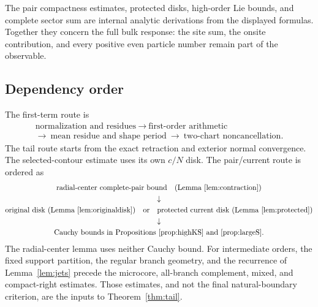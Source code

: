 \documentclass[11pt]{article}
\numberwithin{equation}{section}
\theoremstyle{definition}
\begin{document}
The pair compactness estimates, protected disks, high-order Lie bounds,
and complete sector sum are internal analytic derivations from the
displayed formulas. Together they concern the full bulk response: the
site sum, the onsite contribution, and every positive even particle
number remain part of the observable.

\subsection{Dependency order}
The first-term route is
\[
 \begin{gathered}
 \text{normalization and residues}
 \ \longrightarrow\ \text{first-order arithmetic}\\
 \longrightarrow\ \text{mean residue and shape period}
 \ \longrightarrow\ \text{two-chart noncancellation}.
 \end{gathered}
\]
The tail route starts from the exact retraction and exterior normal
convergence. The selected-contour estimate uses its own \(c/N\)
disk. The pair/current route is ordered as
\[
 \begin{gathered}
 \text{radial-center complete-pair bound}
       \quad\text{(Lemma~\ref{lem:contraction})}\\
 \downarrow\\
 \text{original disk (Lemma~\ref{lem:originaldisk})}
 \quad\text{or}\quad
 \text{protected current disk (Lemma~\ref{lem:protected})}\\
 \downarrow\\
 \text{Cauchy bounds in Propositions~\ref{prop:highKS}
       and \ref{prop:largeS}.}
 \end{gathered}
\]
The radial-center lemma uses neither Cauchy bound.
For intermediate orders, the fixed support partition, the regular
branch geometry, and the recurrence of Lemma~\ref{lem:jets} precede
the microcore, all-branch complement, mixed, and compact-right
estimates. Those estimates, and not the final natural-boundary
criterion, are the inputs to Theorem~\ref{thm:tail}.
\end{document}
